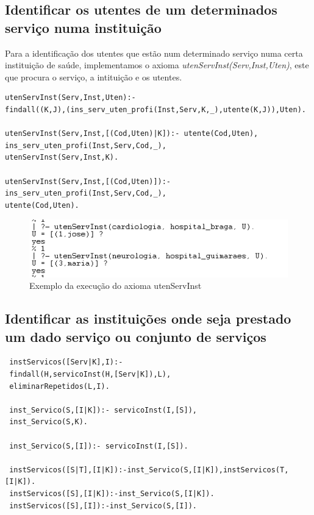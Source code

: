 \subsection{Identificar os utentes de um determinados serviço numa instituição}
Para a identificação dos utentes que estão num determinado serviço numa certa instituição de saúde, implementamos o axioma \textit{utenServInst(Serv,Inst,Uten)}, este que procura o serviço, a intituição e os utentes. 
\begin{verbatim}
utenServInst(Serv,Inst,Uten):- 
findall((K,J),(ins_serv_uten_profi(Inst,Serv,K,_),utente(K,J)),Uten). 

utenServInst(Serv,Inst,[(Cod,Uten)|K]):- utente(Cod,Uten),
ins_serv_uten_profi(Inst,Serv,Cod,_),
utenServInst(Serv,Inst,K).

utenServInst(Serv,Inst,[(Cod,Uten)]):- ins_serv_uten_profi(Inst,Serv,Cod,_),
utente(Cod,Uten).
\end{verbatim}

\begin{figure}[<+htpb+>]
	\centering
	\includegraphics[scale=0.9]{answer4.png}
	\caption{Exemplo da execução do axioma utenServInst}
	\label{p3:fig:output4}
\end{figure}


\subsection{Identificar as instituições onde seja prestado um dado serviço ou conjunto de serviços}



\begin{verbatim}
 instServicos([Serv|K],I):-    
 findall(H,servicoInst(H,[Serv|K]),L),
 eliminarRepetidos(L,I).
 
 inst_Servico(S,[I|K]):- servicoInst(I,[S]),
 inst_Servico(S,K).  
 
 inst_Servico(S,[I]):- servicoInst(I,[S]).
 
 instServicos([S|T],[I|K]):-inst_Servico(S,[I|K]),instServicos(T,[I|K]).
 instServicos([S],[I|K]):-inst_Servico(S,[I|K]).
 instServicos([S],[I]):-inst_Servico(S,[I]).
\end{verbatim}


